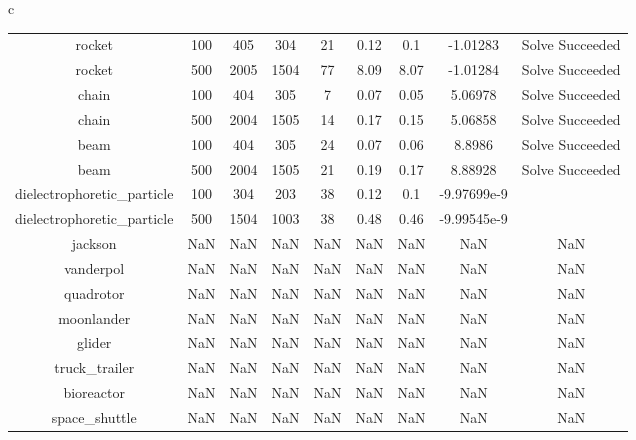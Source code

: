 \documentclass{standalone}
\begin{document}
\begin{tabular}{c}
\begin{tabular}{ccccccccc}
  rocket & 100 & 405 & 304 & 21 & 0.12 & 0.1 & -1.01283 & Solve Succeeded \\
  rocket & 500 & 2005 & 1504 & 77 & 8.09 & 8.07 & -1.01284 & Solve Succeeded \\
  chain & 100 & 404 & 305 & 7 & 0.07 & 0.05 & 5.06978 & Solve Succeeded \\
  chain & 500 & 2004 & 1505 & 14 & 0.17 & 0.15 & 5.06858 & Solve Succeeded \\
  beam & 100 & 404 & 305 & 24 & 0.07 & 0.06 & 8.8986 & Solve Succeeded \\
  beam & 500 & 2004 & 1505 & 21 & 0.19 & 0.17 & 8.88928 & Solve Succeeded \\
  dielectrophoretic\_particle & 100 & 304 & 203 & 38 & 0.12 & 0.1 & -9.97699e-9 & \color{red}{Infeasible Problem} \\
  dielectrophoretic\_particle & 500 & 1504 & 1003 & 38 & 0.48 & 0.46 & -9.99545e-9 & \color{red}{Infeasible Problem} \\
  jackson & NaN & NaN & NaN & NaN & NaN & NaN & NaN & NaN \\
  vanderpol & NaN & NaN & NaN & NaN & NaN & NaN & NaN & NaN \\
  quadrotor & NaN & NaN & NaN & NaN & NaN & NaN & NaN & NaN \\
  moonlander & NaN & NaN & NaN & NaN & NaN & NaN & NaN & NaN \\
  glider & NaN & NaN & NaN & NaN & NaN & NaN & NaN & NaN \\
  truck\_trailer & NaN & NaN & NaN & NaN & NaN & NaN & NaN & NaN \\
  bioreactor & NaN & NaN & NaN & NaN & NaN & NaN & NaN & NaN \\
  space\_shuttle & NaN & NaN & NaN & NaN & NaN & NaN & NaN & NaN \\\hline
\end{tabular}
\end{tabular}
\end{document}
